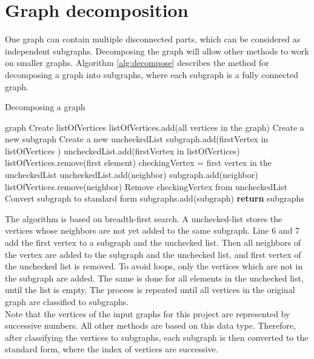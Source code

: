 \documentclass[a4paper]{report}
\begin{document}
		\section{Graph decomposition}
		One graph can contain multiple disconnected parts, which can be considered as independent subgraphs. Decomposing the graph will allow other methods to work on smaller graphs. Algorithm \ref{alg:decompose} describes the method for decomposing a graph into subgraphs, where each subgraph is a fully connected graph.\\
		\begin{algorithm}
			\caption{Decomposing a graph}
			\label{alg:decompose}
			\begin{algorithmic}[1]
				\REQUIRE graph
				\STATE Create listOfVertices 
				\STATE listOfVertices.add(all vertices in the graph)
				\STATE Create a new subgraph
				\STATE Create a new uncheckedList
				\STATE subgraph.add(firstVertex in listOfVertices )
				\STATE uncheckedList.add(firstVertex in listOfVertices)
				\STATE listOfVertices.remove(first element)
				\STATE checkingVertex = first vertex in the uncheckedList
				\STATE uncheckedList.add(neighbor)
				\STATE subgraph.add(neighbor)
				\ENDIF
				\STATE listOfVertices.remove(neighbor)
				\ENDFOR
				\STATE Remove checkingVertex from uncheckedList
				\ENDWHILE
				\STATE Convert subgraph to standard form
				\STATE subgraphs.add(subgraph)
				\ENDWHILE
				\STATE \textbf{return} subgraphs
				
			\end{algorithmic}
		\end{algorithm}
		The algorithm is based on breadth-first search. A unchecked-list stores the vertices whose neighbors are not yet added to the same subgraph. Line 6 and 7 add the first vertex to a subgraph and the unchecked list. Then all neighbors of the vertex are added to the subgraph and the unchecked list, and first vertex of the unchecked list is removed. To avoid loops, only the vertices which are not in the subgraph are added. The same is done for all elements in the unchecked list, until the list is empty. The process is repeated until all vertices in the original graph are classified to subgraphs.\\
		Note that the vertices of the input graphs for this project are represented by successive numbers. All other methods are based on this data type. Therefore, after classifying the vertices to subgraphs, each subgraph is then converted to the standard form, where the index of vertices are successive.
		
\end{document}
